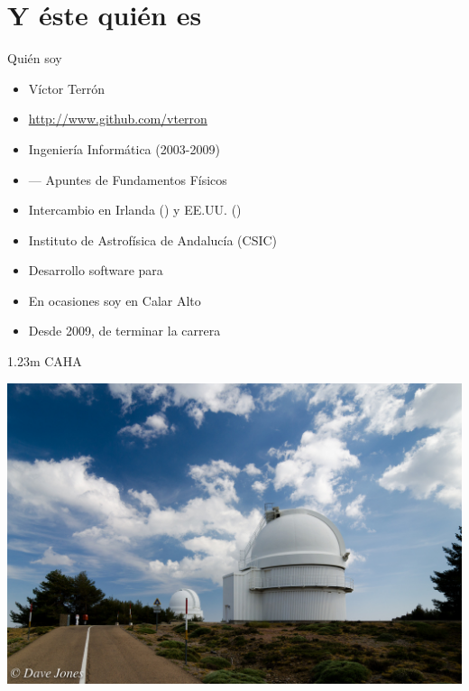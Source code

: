 \documentclass[14pt]{beamer}
\begin{document}

\section{Y éste quién es}
\begin{frame}{Quién soy}
\begin{itemize}
  \item Víctor Terrón
  \item \url{http://www.github.com/vterron}
  \item Ingeniería Informática (2003-2009)
  \item {} — Apuntes de Fundamentos Físicos
  \item Intercambio en Irlanda () y EE.UU. ()
  \item Instituto de Astrofísica de Andalucía (CSIC)
  \item Desarrollo software para 
  \item En ocasiones soy  en Calar Alto
  \item Desde 2009,  de terminar la carrera
\end{itemize}
\end{frame}

\begin{frame}{1.23m CAHA}
  \begin{center}
    \includegraphics[height=0.8\textheight]{pics/123m_CAHA_1.jpg}
  \end{center}
\end{frame}
\end{document}
